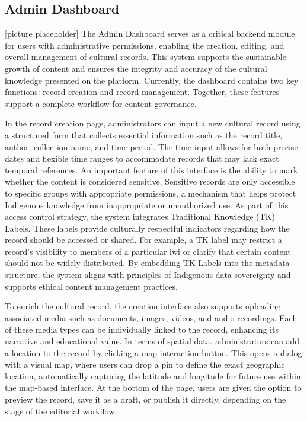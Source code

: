 \subsection{Admin Dashboard}
[picture placeholder]
The Admin Dashboard serves as a critical backend module for users with administrative permissions, enabling the creation, editing, and overall management of cultural records. This system supports the sustainable growth of content and ensures the integrity and accuracy of the cultural knowledge presented on the platform. Currently, the dashboard contains two key functions: record creation and record management. Together, these features support a complete workflow for content governance.

In the record creation page, administrators can input a new cultural record using a structured form that collects essential information such as the record title, author, collection name, and time period. The time input allows for both precise dates and flexible time ranges to accommodate records that may lack exact temporal references. An important feature of this interface is the ability to mark whether the content is considered sensitive. Sensitive records are only accessible to specific groups with appropriate permissions, a mechanism that helps protect Indigenous knowledge from inappropriate or unauthorized use. As part of this access control strategy, the system integrates Traditional Knowledge (TK) Labels. These labels provide culturally respectful indicators regarding how the record should be accessed or shared. For example, a TK label may restrict a record's visibility to members of a particular iwi or clarify that certain content should not be widely distributed. By embedding TK Labels into the metadata structure, the system aligns with principles of Indigenous data sovereignty and supports ethical content management practices.

To enrich the cultural record, the creation interface also supports uploading associated media such as documents, images, videos, and audio recordings. Each of these media types can be individually linked to the record, enhancing its narrative and educational value. In terms of spatial data, administrators can add a location to the record by clicking a map interaction button. This opens a dialog with a visual map, where users can drop a pin to define the exact geographic location, automatically capturing the latitude and longitude for future use within the map-based interface. At the bottom of the page, users are given the option to preview the record, save it as a draft, or publish it directly, depending on the stage of the editorial workflow.

